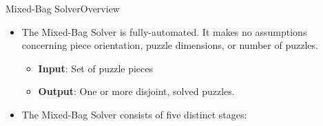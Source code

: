 \documentclass[10pt]{beamer}
\begin{document}
\begin{frame}{Mixed-Bag Solver}{Overview}
  \begin{itemize}
    \item The Mixed-Bag Solver is fully-automated.  It makes no assumptions concerning piece orientation, puzzle dimensions, or number of puzzles.
    \vspace{0.4em}
    \begin{itemize}
      \setlength\itemsep{0.8em}
      \item \textbf{Input}: Set of puzzle pieces
      \item \textbf{Output}: One or more disjoint, solved puzzles.
    \end{itemize}
    \vfill    
    \item The Mixed-Bag Solver consists of five distinct stages:
	  \vspace{-0.4em}
  \end{itemize}
  \begin{center}
    \vfill    
  \end{center}
\end{frame}
\end{document}
